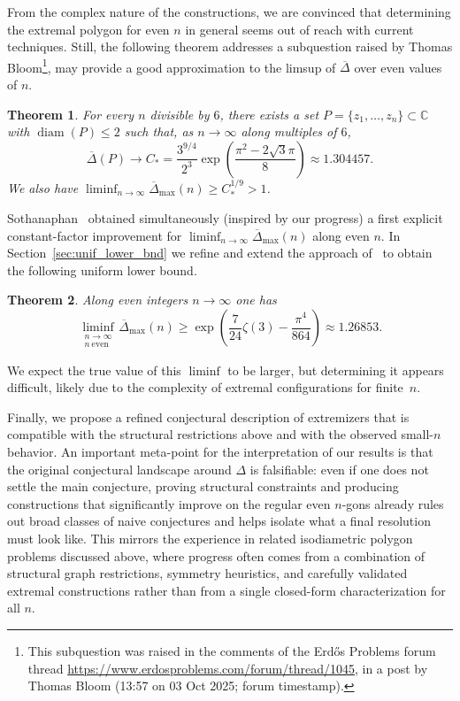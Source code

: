 \documentclass{article}
\DeclareMathOperator{\diam}{diam}
\newtheorem{thr}{Theorem}
\theoremstyle{definition}
\let\le\leqslant
\let\ge\geqslant
\newcommand*{\oD}{\overline \Delta}
\begin{document}
From the complex nature of the constructions, we are convinced that determining the extremal polygon for even $n$ in general seems out of reach with current techniques. Still, the following theorem addresses a subquestion raised by Thomas Bloom\footnote{This subquestion was raised in the comments of the Erd\H{o}s Problems forum thread \url{https://www.erdosproblems.com/forum/thread/1045}, in a post by Thomas Bloom (13:57 on 03 Oct 2025; forum timestamp).}, may provide a good approximation to the limsup of $\oD$ over even values of $n$.


\begin{thr}\label{thr:6mult}
For every $n$ divisible by $6$, there exists a set $P=\{z_1,\dots,z_n\}\subset\mathbb C$ with $\diam(P)\le 2$
such that, as $n\to\infty$ along multiples of $6$,
\[
\oD(P) \to C_{*} = \frac{3^{9/4}}{2^3}\exp\left( \frac{\pi^2-2 \sqrt 3 \pi}{8} \right)\approx 1.304457.
\]
We also have $\liminf_{n\to\infty} \oD_{\max}(n) \ge C_{*}^{1/9}>1$.
\end{thr}




Sothanaphan~\cite{Natso25} obtained simultaneously (inspired by our progress) a first explicit constant-factor improvement for $\liminf_{n\to\infty}\oD_{\max}(n)$ along even $n$.
In Section~\ref{sec:unif_lower_bnd} we refine and extend the approach of~\cite{Natso25} to obtain the following
uniform lower bound.

\begin{thr}\label{thm:main_unifom_even_n_1}
Along even integers $n\to\infty$ one has
\[
\liminf_{\substack{n\to\infty\\ n\ \mathrm{even}}}\oD_{\max}(n)
\ge
\exp\left(\frac{7}{24}\zeta(3)-\frac{\pi^4}{864}\right)
\approx 1.26853.
\]
\end{thr}

We expect the true value of this $\liminf$ to be larger, but determining it appears difficult,
likely due to the complexity of extremal configurations for finite~$n$.


Finally, we propose a refined conjectural description of extremizers that is compatible with the structural restrictions above and with the observed small-$n$ behavior.
An important meta-point for the interpretation of our results is that the original conjectural landscape around $\Delta$ is falsifiable:
even if one does not settle the main conjecture, proving structural constraints and producing constructions that significantly improve on the regular even $n$-gons
already rules out broad classes of naive conjectures and helps isolate what a final resolution must look like.
This mirrors the experience in related isodiametric polygon problems discussed above, where progress often comes from a combination of structural graph restrictions,
symmetry heuristics, and carefully validated extremal constructions rather than from a single closed-form characterization for all $n$.
\end{document}
